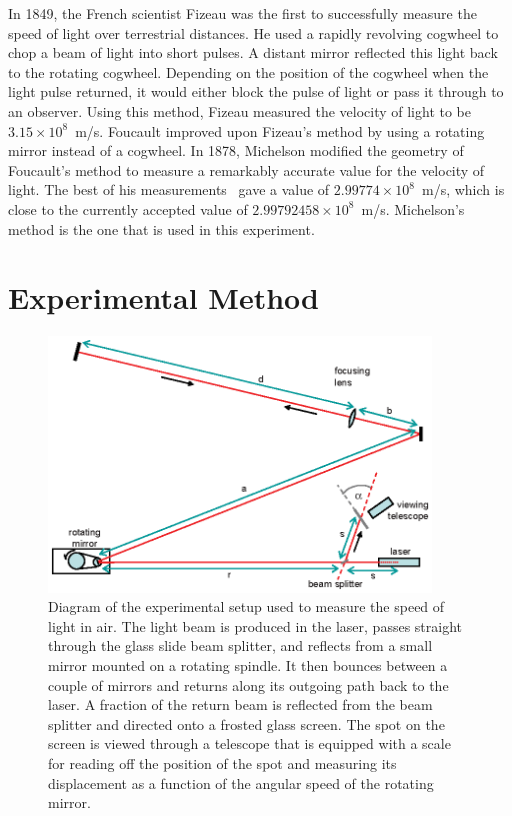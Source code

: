 \documentclass{revtex4}
\begin{document}
In 1849, the French scientist Fizeau was the first to successfully measure
the speed of light over terrestrial distances. He used a rapidly revolving
cogwheel to chop a beam of light into short pulses. A distant mirror reflected
this light back to the rotating cogwheel. Depending on the position of the
cogwheel when the light pulse returned, it would either block the pulse
of light or pass it through to an observer. Using this method, Fizeau measured
the velocity of light to be $3.15\times 10^8$~m/s.
Foucault improved upon Fizeau's method by using a rotating mirror instead of
a cogwheel.  In 1878, Michelson modified the geometry of Foucault's method
to measure a remarkably accurate value for the velocity of light. The best
of his measurements~\cite{Bates88} gave a value of $2.99774\times 10^8$~m/s,
which is close to the currently accepted value of $2.99792458\times 10^8$~m/s.
Michelson's method is the one that is used in this experiment.

\section{Experimental Method}

\begin{figure}
\includegraphics[width=4in]{clightsetup.eps}
\caption{\label{clightsetup}
Diagram of the experimental setup used to measure the speed of light in
air.  The light beam is produced in the laser, passes straight through the
glass slide beam splitter, and reflects from a small mirror mounted on a
rotating spindle.  It then bounces between a couple of mirrors and returns
along its outgoing path back to the laser.  A fraction of the return beam
is reflected from the beam splitter and directed onto a frosted glass
screen.  The spot on the screen is viewed through a telescope that is
equipped with a scale for reading off the position of the spot and 
measuring its displacement as a function of the angular speed of the
rotating mirror.}
\end{figure}
\end{document}

